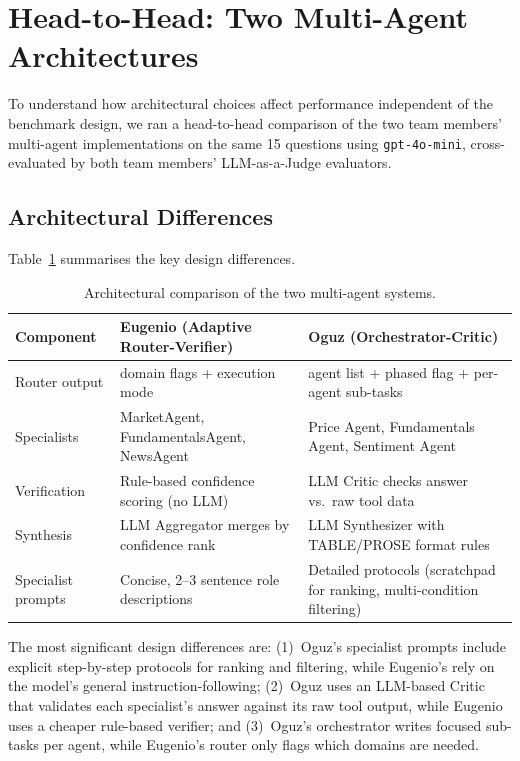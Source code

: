 \documentclass[conference]{IEEEtran}
\begin{document}
\section{Head-to-Head: Two Multi-Agent Architectures}

To understand how architectural choices affect performance independent of the benchmark
design, we ran a head-to-head comparison of the two team members' multi-agent
implementations on the same 15 questions using \texttt{gpt-4o-mini}, cross-evaluated by
both team members' LLM-as-a-Judge evaluators.

\subsection{Architectural Differences}

Table~\ref{tab:arch-diff} summarises the key design differences.

\begin{table}[H]
\centering
\caption{Architectural comparison of the two multi-agent systems.}
\label{tab:arch-diff}
\begin{tabular}{p{2.2cm}p{2.8cm}p{2.8cm}}
\toprule
\textbf{Component} & \textbf{Eugenio (Adaptive Router-Verifier)} & \textbf{Oguz (Orchestrator-Critic)} \\
\midrule
Router output & domain flags + execution mode & agent list + phased flag + per-agent sub-tasks \\
Specialists   & MarketAgent, FundamentalsAgent, NewsAgent & Price Agent, Fundamentals Agent, Sentiment Agent \\
Verification  & Rule-based confidence scoring (no LLM) & LLM Critic checks answer vs.\ raw tool data \\
Synthesis     & LLM Aggregator merges by confidence rank & LLM Synthesizer with TABLE/PROSE format rules \\
Specialist prompts & Concise, 2--3 sentence role descriptions & Detailed protocols (scratchpad for ranking, multi-condition filtering) \\
\bottomrule
\end{tabular}
\end{table}

The most significant design differences are: (1)~Oguz's specialist prompts include
explicit step-by-step protocols for ranking and filtering, while Eugenio's rely on the
model's general instruction-following; (2)~Oguz uses an LLM-based Critic that validates
each specialist's answer against its raw tool output, while Eugenio uses a cheaper
rule-based verifier; and (3)~Oguz's orchestrator writes focused sub-tasks per agent,
while Eugenio's router only flags which domains are needed.
\end{document}
